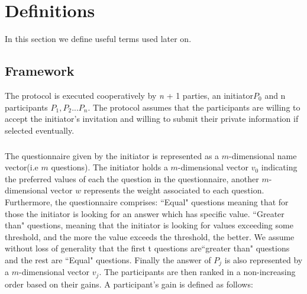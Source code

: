 \documentclass[11pt, a4paper, oneside, openright]{book} %
\begin{document}
\newpage

\chapter{Definitions}
In this section we define useful terms used later on.



\section {Framework}
The protocol is executed cooperatively by  \textit{n} + 1 parties, an initiator$P_0$ and n participants $P_1, P_2... P_n$. The protocol assumes that the participants are willing to accept the initiator's invitation and willing to submit their private information if selected eventually. 
\paragraph{}
The questionnaire given by the initiator is represented as a $m$-dimensional name vector(i.e $m$ questions). The initiator holds a $m$-dimensional vector $v_0$ indicating the preferred values of each the question in the questionnaire, another $m$-dimensional vector $w$ represents the weight associated to each question. Furthermore, the questionnaire comprises: ``Equal" questions meaning that for those the initiator is looking for an answer which has specific value. ``Greater than" questions, meaning that the initiator is looking for values exceeding some threshold, and the more the value exceeds the threshold, the better. We assume without loss of generality that the first t questions are``greater than" questions and the rest are ``Equal" questions. Finally the answer of $P_j$ is also represented by a $m$-dimensional vector  $v_j$. The participants are then ranked in a non-increasing order based on their gains.
A participant's gain is defined as follows:
\end{document}
